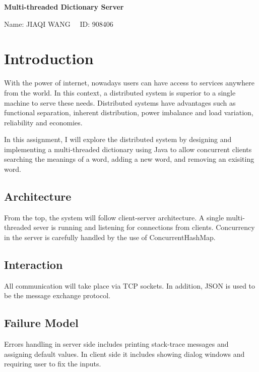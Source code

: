 \documentclass[12pt]{article}
\begin{document}
\pagestyle{fancy}

\thispagestyle{empty}
\begin{center}
\Large{}
\end{center}

\begin{center}
\Large\bf{Multi-threaded Dictionary Server}
\end{center}

\begin{center}
Name: JIAQI WANG \ \ ID: 908406
\end{center}

\section{Introduction}
With the power of internet, nowadays users can have access to services anywhere from the world. In this context, a distributed system is superior to a single machine to serve these needs. Distributed systems have advantages such as functional separation, inherent distribution, power imbalance and load variation, reliability and economies.

In this assignment, I will explore the distributed system by designing and implementing a multi-threaded dictionary using Java to allow concurrent clients searching the meanings of a word, adding a new word, and removing an exisiting word.

\subsection{Architecture}
From the top, the system will follow client-server architecture. A single multi-threaded sever is running and listening for connections from clients. Concurrency in the server is carefully handled by the use of ConcurrentHashMap.

\subsection{Interaction}
All communication will take place via TCP sockets. In addition, JSON is used to be the message exchange protocol.

\subsection{Failure Model}
Errors handling in server side includes printing stack-trace messages and assigning default values. In client side it includes showing dialog windows and requiring user to fix the inputs.
\end{document}

